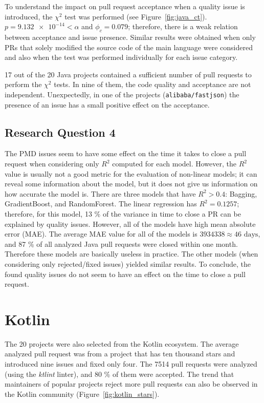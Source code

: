 \documentclass[digital,oneside,oldtable,nolof,nolot,nocover]{fithesis4}
\begin{document}
To understand the impact on pull request acceptance when a quality issue is introduced,
the \(\chi^2\) test was performed (see Figure~\ref{fig:java_ct}).
\(p = \num{9.132e-14} < \alpha\) and \(\phi_c = 0.079\); therefore, there is
a weak relation between acceptance and issue presence. Similar results were
obtained when only PRs that solely modified the source code of the main language were
considered and also when the test was performed individually for each issue category.

17 out of the 20 Java projects contained a sufficient number of pull requests to
perform the \(\chi^2\) tests. In nine of them, the code quality and acceptance are
not independent. Unexpectedly, in one of the projects (\texttt{alibaba/fastjson}) the
presence of an issue has a small positive effect on the acceptance.
\subsection{Research Question 4}
\label{sec:org3482539}
The PMD issues seem to have some effect on the time it takes to close a pull
request when considering only \(R^2\) computed for each model. However, the
\(R^2\) value is usually not a good metric for the evaluation of non-linear models;
it can reveal some information about the model, but it does not give us
information on how accurate the model is. There are three models that have \(R^2
    > 0.4\): Bagging, GradientBoost, and RandomForest.  The linear regression has
\(R^2 = 0.1257\); therefore, for this model, 13 \% of the variance in time to close a
PR can be explained by quality issues. However, all of the models have high mean
absolute error (MAE). The average MAE value for all of the models is \(3934338
    \approx 46\text{ days}\), and 87 \% of all analyzed Java pull requests were
closed within one month. Therefore these models are basically useless in
practice. The other models (when considering only rejected/fixed issues) yielded
similar results. To conclude, the found quality issues do not seem to have an
effect on the time to close a pull request.
\FloatBarrier
\section{Kotlin}
\label{sec:org5fa10ec}
The 20 projects were also selected from the Kotlin ecosystem.
The average analyzed pull request was from a project that has ten thousand
stars and introduced nine issues and fixed only four. The 7514 pull requests
were analyzed (using the \emph{ktlint} linter), and 80 \% of them were accepted.
The trend that maintainers of popular projects reject more pull requests can
also be observed in the Kotlin community (Figure~\ref{fig:kotlin_stars}).
\end{document}
